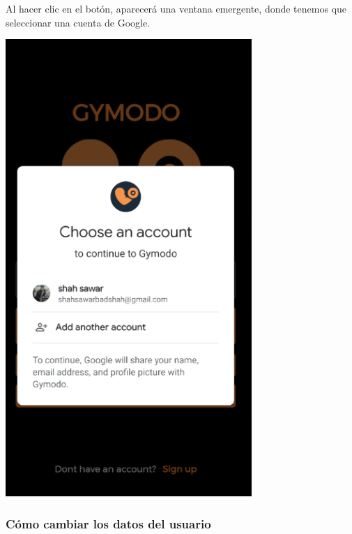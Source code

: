 \documentclass[12pt,a4paper]{article}
\begin{document}
\begin{enumerate}
\begin{minipage}{.60\textwidth}
  \item Al hacer clic en el botón, aparecerá una ventana emergente, donde tenemos que seleccionar una cuenta de Google.
\end{minipage}
\begin{minipage}{.40\textwidth}
  \includegraphics[width=0.7\textwidth, right]{logingooglepage}
\end{minipage}
\end{enumerate}

\clearpage

\subsubsection{Cómo cambiar los datos del usuario}
\end{document}
